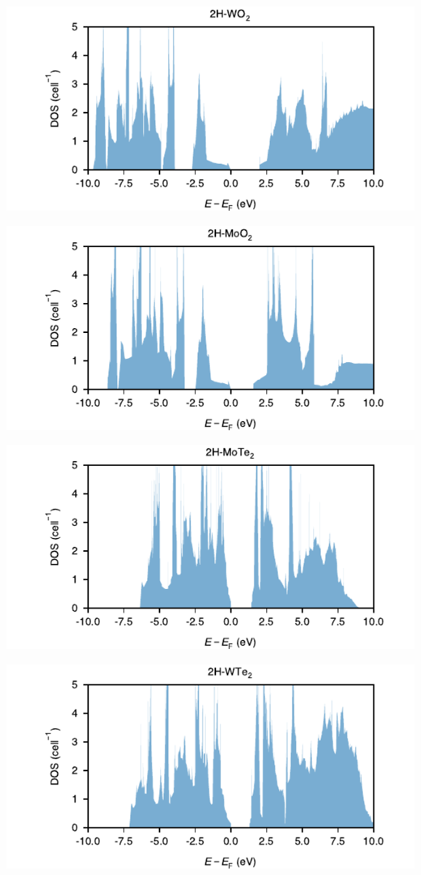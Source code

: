 \begin{center}
\includegraphics[width=.9\linewidth]{img/SI_figs/2H-WO2-DOS.pdf}
\end{center}
\begin{center}
\includegraphics[width=.9\linewidth]{img/SI_figs/2H-MoO2-DOS.pdf}
\end{center}
\begin{center}
\includegraphics[width=.9\linewidth]{img/SI_figs/2H-MoTe2-DOS.pdf}
\end{center}
\begin{center}
\includegraphics[width=.9\linewidth]{img/SI_figs/2H-WTe2-DOS.pdf}
\end{center}
